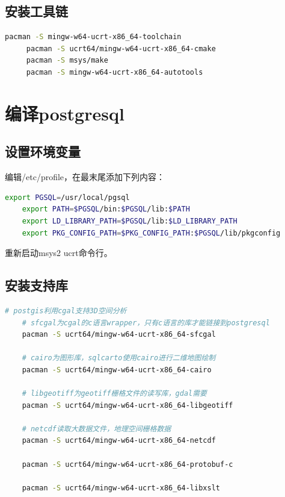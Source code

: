\subsection{安装工具链}

\begin{lstlisting}[language=bash]
	 pacman -S mingw-w64-ucrt-x86_64-toolchain
	 pacman -S ucrt64/mingw-w64-ucrt-x86_64-cmake 
	 pacman -S msys/make
	 pacman -S mingw-w64-ucrt-x86_64-autotools
\end{lstlisting}

\section{编译postgresql}
\subsection{设置环境变量}
编辑/etc/profile，在最末尾添加下列内容：
\begin{lstlisting}[backgroundcolor = \color{codebackground}, language=bash]
	export PGSQL=/usr/local/pgsql
	export PATH=$PGSQL/bin:$PGSQL/lib:$PATH
	export LD_LIBRARY_PATH=$PGSQL/lib:$LD_LIBRARY_PATH
	export PKG_CONFIG_PATH=$PKG_CONFIG_PATH:$PGSQL/lib/pkgconfig
\end{lstlisting}
重新启动msys2 ucrt命令行。

\subsection{安装支持库}

\begin{lstlisting}[backgroundcolor = \color{codebackground}, language=bash]
	# postgis利用cgal支持3D空间分析
	# sfcgal为cgal的c语言wrapper，只有c语言的库才能链接到postgresql
	pacman -S ucrt64/mingw-w64-ucrt-x86_64-sfcgal 
	
	# cairo为图形库，sqlcarto使用cairo进行二维地图绘制
	pacman -S ucrt64/mingw-w64-ucrt-x86_64-cairo 
	
	# libgeotiff为geotiff栅格文件的读写库，gdal需要
	pacman -S ucrt64/mingw-w64-ucrt-x86_64-libgeotiff 
	
	# netcdf读取大数据文件，地理空间栅格数据
	pacman -S ucrt64/mingw-w64-ucrt-x86_64-netcdf
	
	pacman -S ucrt64/mingw-w64-ucrt-x86_64-protobuf-c
	
	pacman -S ucrt64/mingw-w64-ucrt-x86_64-libxslt
	
\end{lstlisting}


